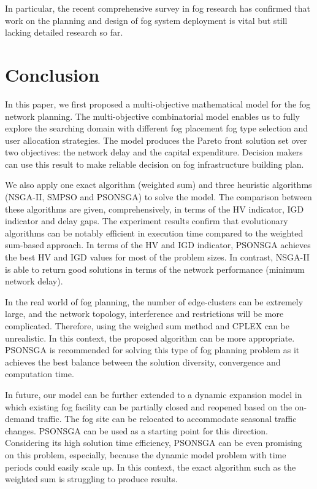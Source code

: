 \documentclass[10pt,journal,compsoc]{IEEEtran}
\begin{document}

In particular, the recent comprehensive survey \cite{mouradian2017comprehensive} in fog research has confirmed that work on the planning and design of fog system deployment is vital but still lacking detailed research so far.

\section{Conclusion}\label{conclu}
In this paper, we first proposed a multi-objective mathematical model for the fog network planning. The multi-objective combinatorial model enables us to fully explore the searching domain with different fog placement fog type selection and user allocation strategies. The model produces the Pareto front solution set over two objectives: the network delay and the capital expenditure. Decision makers can use this result to make reliable decision on fog infrastructure building plan. 

We also apply one exact algorithm (weighted sum) and three heuristic algorithms (NSGA-II, SMPSO and PSONSGA) to solve the model. The comparison between these algorithms are given, comprehensively, in terms of the HV indicator, IGD indicator and delay gaps. The experiment results confirm that evolutionary algorithms can be notably efficient in execution time compared to the weighted sum-based approach. In terms of the HV and IGD indicator, PSONSGA achieves the best HV and IGD values for most of the problem sizes. In contrast, NSGA-II is able to return good solutions in terms of the network performance (minimum network delay).

In the real world of fog planning, the number of edge-clusters can be extremely large, and the network topology, interference and restrictions will be more complicated. Therefore, using the weighed sum method and CPLEX can be unrealistic. In this context, the proposed algorithm can be more appropriate. PSONSGA is recommended for solving this type of fog planning problem as it achieves the best balance between the solution diversity, convergence and computation time.

In future, our model can be further extended to a dynamic expansion model in which existing fog facility can be partially closed and reopened based on the on-demand traffic. The fog site can be relocated to accommodate seasonal traffic changes. PSONSGA can be used as a starting point for this direction. Considering its high solution time efficiency, PSONSGA can be even promising on this problem, especially, because the dynamic model problem with time periods could easily scale up. In this context, the exact algorithm such as the weighted sum is struggling to produce results.
\end{document}
